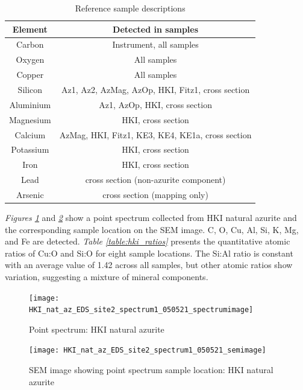 \begin{table}[H]
\caption{Reference sample descriptions}
\centering
\label{table:eds_elems}
\begin{tabular}{c c}
\toprule
Element & Detected in samples \\
\midrule
Carbon & Instrument, all samples \\
Oxygen & All samples \\
Copper & All samples \\
Silicon & Az1, Az2, AzMag, AzOp, HKI, Fitz1, cross section \\
Aluminium & Az1, AzOp, HKI, cross section \\
Magnesium & HKI, cross section \\
Calcium & AzMag, HKI, Fitz1, KE3, KE4, KE1a, cross section \\
Potassium & HKI, cross section \\
Iron & HKI, cross section \\
Lead & cross section (non-azurite component) \\
Arsenic & cross section (mapping only) \\
\bottomrule
\end{tabular}
\end{table}

\textit{Figures \ref{fig:hki_eds_spectrum}} and \textit{\ref{fig:hki_eds_sem_image}} show a point spectrum collected from HKI natural azurite and the corresponding sample location on the SEM image. C, O, Cu, Al, Si, K, Mg, and Fe are detected. \textit{Table \ref{table:hki_ratios}} presents the quantitative atomic ratios of Cu:O and Si:O for eight sample locations. The Si:Al ratio is constant with an average value of 1.42 across all samples, but other atomic ratios show variation, suggesting a mixture of mineral components.

\begin{figure}[H]
\centering
  \texttt{[image: HKI\_nat\_az\_EDS\_site2\_spectrum1\_050521\_spectrumimage]}
\caption[Point spectrum: HKI natural azurite]{Point spectrum: HKI natural azurite}
\label{fig:hki_eds_spectrum}
\end{figure}

\begin{figure}[H]
\centering
  \texttt{[image: HKI\_nat\_az\_EDS\_site2\_spectrum1\_050521\_semimage]}
\caption[SEM image showing point spectrum sample location: HKI natural azurite]{SEM image showing point spectrum sample location: HKI natural azurite}
\label{fig:hki_eds_sem_image}
\end{figure}

